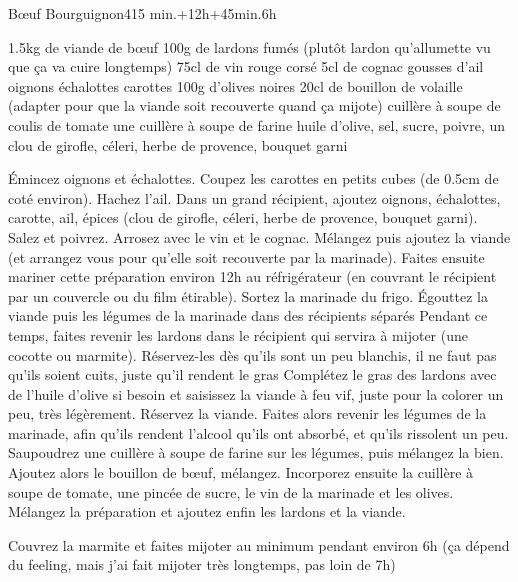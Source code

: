 \begin{recette}{Bœuf Bourguignon}{4}{15 min.+12h+45min.}{6h}
\begin{ingredients}
\ingredient 1.5kg de viande de bœuf
\ingredient 100g de lardons fumés (plutôt lardon qu'allumette vu que ça va cuire longtemps)
\ingredient 75cl de vin rouge corsé
\ingredient 5cl de cognac
 gousses d'ail
 oignons
 échalottes
 carottes
\ingredient 100g d'olives noires
\ingredient 20cl de bouillon de volaille (adapter pour que la viande soit recouverte quand ça mijote)
 cuillère à soupe de coulis de tomate
\ingredient une cuillère à soupe de farine
\ingredient huile d'olive, sel, sucre, poivre, un clou de girofle, céleri, herbe de provence, bouquet garni
\end{ingredients}

\begin{preparation}
\etape Émincez oignons et échalottes. Coupez les carottes en petits cubes (de 0.5cm de coté environ). Hachez l'ail. 
\etape Dans un grand récipient, ajoutez oignons, échalottes, carotte, ail, épices (clou de girofle, céleri, herbe de provence,
bouquet garni). Salez et poivrez. Arrosez avec le vin et le cognac. Mélangez puis ajoutez la viande (et arrangez vous pour
qu'elle soit recouverte par la marinade).
\etape Faites ensuite mariner cette préparation environ 12h au réfrigérateur (en couvrant le récipient par un couvercle ou du
film étirable). 
\etape Sortez la marinade du frigo. Égouttez la viande puis les légumes de la marinade dans des récipients séparés
\etape Pendant ce temps, faites revenir les lardons dans le récipient qui servira à mijoter (une cocotte ou marmite).
Réservez-les dès qu'ils sont un peu blanchis, il ne faut pas qu'ils soient cuits, juste qu'il rendent le gras
\etape Complétez le gras des lardons avec de l'huile d'olive si besoin et saisissez la viande à feu vif, juste pour la colorer
un peu, très légèrement. Réservez la viande. 
\etape Faites alors revenir les légumes de la marinade, afin qu'ils rendent l'alcool qu'ils ont absorbé, et qu'ils rissolent un
peu. 
\etape Saupoudrez une cuillère à soupe de farine sur les légumes, puis mélangez la bien. Ajoutez alors le bouillon de bœuf,
mélangez. 
\etape Incorporez ensuite la cuillère à soupe de tomate, une pincée de sucre, le vin de la marinade et les olives. 
\etape Mélangez la préparation et ajoutez enfin les lardons et la viande. 
\end{preparation}

\begin{cuisson}
Couvrez la marmite et faites mijoter au minimum pendant environ 6h (ça dépend du feeling, mais j'ai fait mijoter très longtemps,
pas loin de 7h)
\end{cuisson}

\end{recette}

